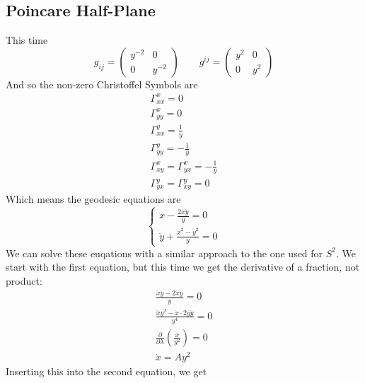 \documentclass{article}
\begin{document}
\subsection{Poincare Half-Plane}
This time
\begin{equation}
    g_{ij} = \begin{pmatrix} y^{-2} & 0 \\ 0 & y^{-2} \end{pmatrix}
    \qquad
    g^{ij} = \begin{pmatrix} y^2 & 0 \\ 0 & y^2 \end{pmatrix}
\end{equation}
And so the non-zero Christoffel Symbols are
\begin{equation}
\begin{gathered}
    \Gamma^{x}_{xx} = 0
    \\
    \Gamma^{x}_{yy} = 0
    \\
    \Gamma^{y}_{xx} = \frac{1}{y}
    \\
    \Gamma^{y}_{yy} = -\frac{1}{y}
    \\
    \Gamma^{x}_{xy} = \Gamma^{x}_{yx} = -\frac{1}{y}
    \\
    \Gamma^{y}_{yx} = \Gamma^{y}_{xy} = 0
\end{gathered}
\end{equation}
Which means the geodesic equations are
\begin{equation}
    \begin{cases}
        \ddot{x} - \frac{2\dot{x}\dot{y}}{y} = 0
        \\
        \ddot{y} + \frac{\dot{x}^2 - \dot{y}^2}{y} = 0
    \end{cases}
\end{equation}
We can solve these euqations with a similar approach to the one used for $S^2$. We start with the first equation, but this time we get the derivative of a fraction, not product:
\begin{equation}
\begin{gathered}
    \frac{\ddot{x}y - 2\dot{x}\dot{y}}{y} = 0
    \\
    \frac{\ddot{x}y^2 - \dot{x}\cdot2y\dot{y}}{y^4} = 0
    \\
    \frac{\partial}{\partial \lambda}\left(\frac{\dot{x}}{y^2}\right) = 0
    \\
    \dot{x} = Ay^2
\end{gathered}
\end{equation}
Inserting this into the second equation, we get
\end{document}
